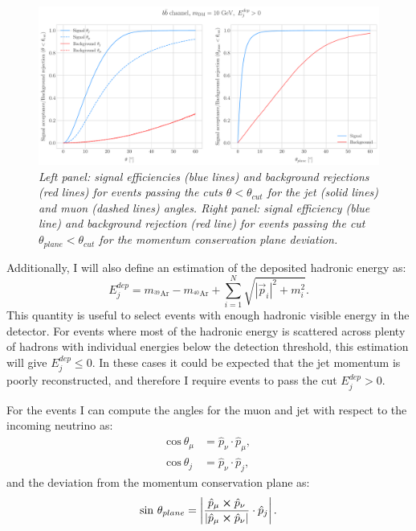 \begin{figure}[t]
	\centering
	\includegraphics[width=0.95\linewidth]{Images/DM_Analysis/solardm_bb_100_dis_angular_cuts.pdf}
	\caption{\textit{Left panel: signal efficiencies (blue lines) and background rejections (red lines) for events passing the cuts $\theta < \theta_{cut}$ for the jet (solid lines) and muon (dashed lines) angles. Right panel: signal efficiency (blue line) and background rejection (red line) for events passing the cut $\theta_{plane} < \theta_{cut}$ for the momentum conservation plane deviation.}}
	\label{fig:solardm_bb_100_dis_angular_cuts}
\end{figure}

Additionally, I will also define an estimation of the deposited hadronic energy as:
\begin{equation}
	E_{j}^{dep} = m_{^{39}\mathrm{Ar}} - m_{^{40}\mathrm{Ar}} + \sum_{i=1}^{N} \sqrt{|\vec{p}_{i}|^{2} + m_{i}^{2}}.
\end{equation}
This quantity is useful to select events with enough hadronic visible energy in the detector. For events where most of the hadronic energy is scattered across plenty of hadrons with individual energies below the detection threshold, this estimation will give $E_{j}^{dep} \leq 0$. In these cases it could be expected that the jet momentum is poorly reconstructed, and therefore I require events to pass the cut $E_{j}^{dep} > 0$.

For the events I can compute the angles for the muon and jet with respect to the incoming neutrino as:
\begin{align}
	\mathrm{cos} \ \theta_{\mu} &= \hat{p}_{\nu} \cdot \hat{p}_{\mu},\\
	\mathrm{cos} \ \theta_{j} &= \hat{p}_{\nu} \cdot \hat{p}_{j},
\end{align}
and the deviation from the momentum conservation plane as:
\begin{equation}
	\mathrm{sin} \ \theta_{plane} = \left|\frac{\hat{p}_{\mu} \cross \hat{p}_{\nu}}{|\hat{p}_{\mu} \cross \hat{p}_{\nu}|} \cdot \hat{p}_{j}\right|.
\end{equation}

